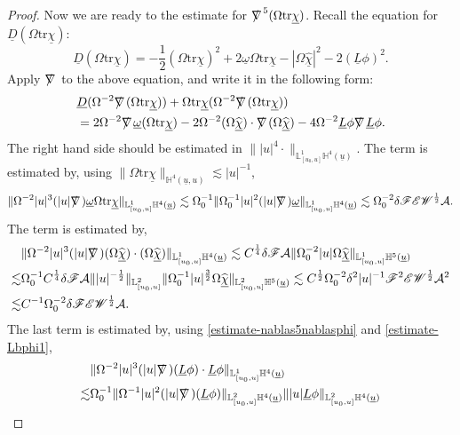 \documentclass[11pt,reqno]{amsart}
\theoremstyle{definition}
\numberwithin{equation}{section}
\newcommand{\tr}{\mathrm{tr}}
\renewcommand{\L}{\mathbb{L}}
\renewcommand{\H}{\mathbb{H}}
\def\chib{\underline{\chi}}
\def\chibh{\widehat{\underline{\chi}}}
\def\Lb{\underline{L}}
\def\tr{\mathrm{tr}}
\def\omegab{\underline{\omega}}
\def\ub{\underline{u}}
\newcommand{\Db}{\underline{D}}
\def\nablas{\mbox{$\nabla \mkern -13mu /$ }}
\begin{document}
\begin{proof}
Now we are ready to the estimate for $\nablas^5(\Omega\tr\chib)$. Recall the equation for $\Db(\Omega\tr\chib)$:
\begin{equation}\label{equ-Dbtrchib}
\Db(\Omega\tr\chib)=-\frac{1}{2}(\Omega\tr\chib)^2+2\omegab\Omega\tr\chib-|\Omega\chibh|^2-2(\Lb\phi)^2.
\end{equation}
Apply $\nablas$ to the above equation, and write it in the following form:
\begin{equation}\label{equ-Dbnablastrchib}
\begin{split}
&\Db(\Omega^{-2}\nablas(\Omega\tr\chib))+\Omega\tr\chib(\Omega^{-2}\nablas(\Omega\tr\chib))\\
&=2\Omega^{-2}\nablas\omegab(\Omega\tr\chib)-2\Omega^{-2}(\Omega\chibh)\cdot\nablas(\Omega\chibh)
-4\Omega^{-2}\Lb\phi\nablas\Lb\phi.\\
\end{split}
\end{equation}
The right hand side should be estimated in $\||u|^4\cdot\|_{\L^1_{[u_0,u]}\H^4(\ub)}$. The  term is estimated by, using $\|\Omega\tr\chib\|_{\H^4(\ub,u)}\lesssim|u|^{-1}$, 
\begin{align*}
\|\Omega^{-2}|u|^3(|u|\nablas)\omegab\Omega\tr\chib\|_{\L^1_{[u_0,u]}\H^4(\ub)}\lesssim\Omega_0^{-1}\|\Omega_0^{-1}|u|^2(|u|\nablas)\omegab\|_{\L^1_{[u_0,u]}\H^4(\ub)}\lesssim\Omega_0^{-2}\delta\mathscr{F}\mathscr{E}\mathscr{W}^{\frac{1}{2}}\mathcal{A}.
\end{align*}
The  term is estimated by, \begin{align*}
&\|\Omega^{-2}|u|^3(|u|\nablas)(\Omega\chibh)\cdot(\Omega\chibh)\|_{\L^1_{[u_0,u]}\H^4(\ub)}\lesssim C^{\frac{1}{4}}\delta\mathscr{F}\mathcal{A}\|\Omega_0^{-2}|u|\Omega\chibh\|_{\L^1_{[u_0,u]}\H^5(\ub)}\\
\lesssim&\Omega_0^{-1}C^{\frac{1}{4}}\delta\mathscr{F}\mathcal{A}\||u|^{-\frac{1}{2}}\|_{\L^2_{[u_0,u]}}\|\Omega_0^{-1}|u|^{\frac{3}{2}}\Omega\chibh\|_{\L^2_{[u_0,u]}\H^5(\ub)}\lesssim C^{\frac{1}{2}}\Omega_0^{-2}\delta^2|u|^{-1}\mathscr{F}^2\mathscr{E}\mathscr{W}^{\frac{1}{2}}\mathcal{A}^2\\
\lesssim& C^{-1}\Omega_0^{-2}\delta\mathscr{F}\mathscr{E}\mathscr{W}^{\frac{1}{2}}\mathcal{A}.
\end{align*}
The last term is estimated by, using \eqref{estimate-nablas5nablasphi} and \eqref{estimate-Lbphi1},
\begin{align*}
&\|\Omega^{-2}|u|^3(|u|\nablas)(\Lb\phi)\cdot\Lb\phi\|_{\L^1_{[u_0,u]}\H^4(\ub)}\\\lesssim&\Omega_0^{-1}\|\Omega^{-1}|u|^2(|u|\nablas)(\Lb\phi)\|_{\L^2_{[u_0,u]}\H^4(\ub)}\||u|\Lb\phi\|_{\L^2_{[u_0,u]}\H^4(\ub)}\\

\end{align*}
\end{proof}
\end{document}
